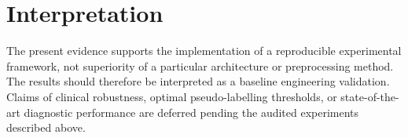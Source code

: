 \section{Interpretation}
The present evidence supports the implementation of a reproducible experimental framework, not superiority of a particular architecture or preprocessing method. The results should therefore be interpreted as a baseline engineering validation. Claims of clinical robustness, optimal pseudo-labelling thresholds, or state-of-the-art diagnostic performance are deferred pending the audited experiments described above.
